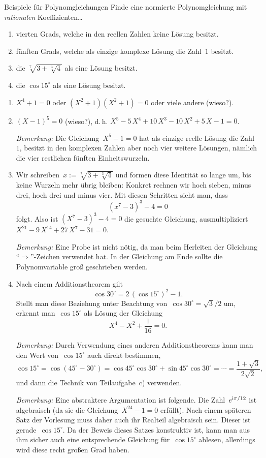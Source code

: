 \documentclass{algblatt}
\begin{document}
\ifloesungen\newpage\fi
\begin{aufgabe}{Beispiele für Polynomgleichungen}
Finde eine normierte Polynomgleichung mit \emph{rationalen} Koeffizienten\ldots
\begin{enumerate}
\item vierten Grads, welche in den reellen Zahlen keine Lösung besitzt.
\item fünften Grads, welche als einzige komplexe Lösung die Zahl~$1$ besitzt.
\item die $\sqrt[7]{3 + \sqrt[3]{4}}$ als eine Lösung besitzt.
\item die $\cos 15^\circ$ als eine Lösung besitzt.
\end{enumerate}
\begin{loesung}\begin{enumerate}
\item $X^4 + 1 = 0$ oder $(X^2 + 1) (X^2 + 1) = 0$ oder viele andere (wieso?).
\item $(X - 1)^5 = 0$ (wieso?), d.\,h. $X^5-5\,X^4+10\,X^3-10\,X^2+5\,X-1 = 0$.

\emph{Bemerkung:} Die Gleichung~$X^5 - 1 = 0$ hat als einzige reelle Lösung die
Zahl~$1$, besitzt in den komplexen Zahlen aber noch vier weitere Lösungen,
nämlich die vier restlichen fünften Einheitswurzeln.
\item Wir schreiben~$x := \sqrt[7]{3 + \sqrt[3]{4}}$ und formen diese Identität
so lange um, bis keine Wurzeln mehr übrig bleiben: Konkret rechnen wir hoch
sieben, minus drei, hoch drei und minus vier. Mit diesen Schritten sieht man,
dass
\[ (x^7 - 3)^3 - 4 = 0 \]
folgt. Also ist $(X^7-3)^3-4=0$ die gesuchte Gleichung, ausmultipliziert
$X^{21}-9\,X^{14}+27\,X^7-31 = 0$.

\emph{Bemerkung:} Eine Probe ist nicht nötig, da man beim Herleiten der
Gleichung "`$\Rightarrow$"'-Zeichen verwendet hat. In der Gleichung am Ende sollte die
Polynomvariable groß geschrieben werden.
\item Nach einem Additionstheorem gilt
\[ \cos 30^\circ = 2 \, (\cos 15^\circ)^2 - 1. \]
Stellt man diese Beziehung unter Beachtung von~$\cos 30^\circ = \sqrt{3}/2$ um, erkennt man~$\cos 15^\circ$ als Lösung der
Gleichung
\[ X^4 - X^2 + \frac{1}{16} = 0. \]

\emph{Bemerkung:} Durch Verwendung eines anderen Additionstheorems kann man den
Wert von~$\cos 15^\circ$ auch direkt bestimmen,
\[ \cos 15^\circ = \cos (45^\circ - 30^\circ) =
  \cos 45^\circ \cos 30^\circ + \sin 45^\circ \cos 30^\circ = \cdots =
  \frac{1 + \sqrt{3}}{2 \sqrt{2}}, \]
und dann die Technik von Teilaufgabe~c) verwenden.

\emph{Bemerkung:} Eine abstraktere Argumentation ist folgende.
Die Zahl~$e^{\mathrm{i} \pi / 12}$ ist algebraisch (da sie die Gleichung~$X^{24} - 1 =
0$ erfüllt). Nach einem späteren Satz der Vorlesung muss daher auch ihr Realteil
algebraisch sein. Dieser ist gerade~$\cos 15^\circ$. Da der Beweis dieses Satzes
konstruktiv ist, kann man aus ihm sicher auch eine entsprechende Gleichung für~$\cos
15^\circ$ ablesen, allerdings wird diese recht großen Grad haben.
\end{enumerate}
\end{loesung}
\end{aufgabe}
\end{document}

